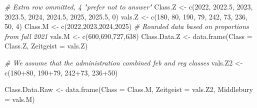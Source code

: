 \documentclass[
]{article}
\newenvironment{Shaded}{\begin{snugshade}}{\end{snugshade}}
\newcommand{\AttributeTok}[1]{\textcolor[rgb]{0.77,0.63,0.00}{#1}}
\newcommand{\CommentTok}[1]{\textcolor[rgb]{0.56,0.35,0.01}{\textit{#1}}}
\newcommand{\DecValTok}[1]{\textcolor[rgb]{0.00,0.00,0.81}{#1}}
\newcommand{\FloatTok}[1]{\textcolor[rgb]{0.00,0.00,0.81}{#1}}
\newcommand{\FunctionTok}[1]{\textcolor[rgb]{0.00,0.00,0.00}{#1}}
\newcommand{\NormalTok}[1]{#1}
\newcommand{\OtherTok}[1]{\textcolor[rgb]{0.56,0.35,0.01}{#1}}
\newcommand{\SpecialCharTok}[1]{\textcolor[rgb]{0.00,0.00,0.00}{#1}}
\begin{document}
\begin{Shaded}
\begin{Highlighting}[]
\CommentTok{\# Extra row ommitted, 4 "prefer not to answer"}
\NormalTok{Class.Z }\OtherTok{\textless{}{-}} \FunctionTok{c}\NormalTok{(}\DecValTok{2022}\NormalTok{, }\FloatTok{2022.5}\NormalTok{, }\DecValTok{2023}\NormalTok{, }\FloatTok{2023.5}\NormalTok{, }\DecValTok{2024}\NormalTok{, }\FloatTok{2024.5}\NormalTok{, }\DecValTok{2025}\NormalTok{, }\FloatTok{2025.5}\NormalTok{, }\DecValTok{0}\NormalTok{)}
\NormalTok{vals.Z }\OtherTok{\textless{}{-}} \FunctionTok{c}\NormalTok{(}\DecValTok{180}\NormalTok{, }\DecValTok{80}\NormalTok{, }\DecValTok{190}\NormalTok{, }\DecValTok{79}\NormalTok{, }\DecValTok{242}\NormalTok{, }\DecValTok{73}\NormalTok{, }\DecValTok{236}\NormalTok{, }\DecValTok{50}\NormalTok{, }\DecValTok{4}\NormalTok{)}
\NormalTok{Class.M }\OtherTok{\textless{}{-}} \FunctionTok{c}\NormalTok{(}\DecValTok{2022}\NormalTok{,}\DecValTok{2023}\NormalTok{,}\DecValTok{2024}\NormalTok{,}\DecValTok{2025}\NormalTok{)}
\CommentTok{\# Rounded data based on proportions from fall 2021}
\NormalTok{vals.M }\OtherTok{\textless{}{-}} \FunctionTok{c}\NormalTok{(}\DecValTok{600}\NormalTok{,}\DecValTok{690}\NormalTok{,}\DecValTok{727}\NormalTok{,}\DecValTok{638}\NormalTok{)}
\NormalTok{Class.Data.Z }\OtherTok{\textless{}{-}} \FunctionTok{data.frame}\NormalTok{(}\AttributeTok{Class =}\NormalTok{ Class.Z,}
                         \AttributeTok{Zeitgeist =}\NormalTok{ vals.Z)}

\CommentTok{\# We assume that the administration combined feb and reg classes}
\NormalTok{vals.Z2 }\OtherTok{\textless{}{-}} \FunctionTok{c}\NormalTok{(}\DecValTok{180}\SpecialCharTok{+}\DecValTok{80}\NormalTok{, }\DecValTok{190}\SpecialCharTok{+}\DecValTok{79}\NormalTok{, }\DecValTok{242}\SpecialCharTok{+}\DecValTok{73}\NormalTok{, }\DecValTok{236}\SpecialCharTok{+}\DecValTok{50}\NormalTok{)}

\NormalTok{Class.Data.Raw }\OtherTok{\textless{}{-}} \FunctionTok{data.frame}\NormalTok{(}\AttributeTok{Class =}\NormalTok{ Class.M,}
                             \AttributeTok{Zeitgeist =}\NormalTok{ vals.Z2,}
                             \AttributeTok{Middlebury =}\NormalTok{ vals.M)}


\end{Highlighting}
\end{Shaded}
\end{document}
